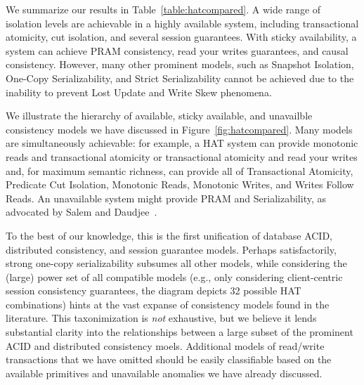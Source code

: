 We summarize our results in Table~\ref{table:hatcompared}. A wide
range of isolation levels are achievable in a highly available system,
including transactional atomicity, cut isolation, and several session
guarantees. With sticky availability, a system can achieve PRAM
consistency, read your writes guarantees, and causal
consistency. However, many other prominent models, such as Snapshot
Isolation, One-Copy Serializability, and Strict Serializability cannot
be achieved due to the inability to prevent Lost Update and Write Skew phenomena.

We illustrate the hierarchy of available, sticky available, and
unavailble consistency models we have discussed in
Figure~\ref{fig:hatcompared}. Many models are simultaneously
achievable: for example, a HAT system can provide monotonic reads and
transactional atomicity or transactional atomicity and read your
writes and, for maximum semantic richness, can provide all of
Transactional Atomicity, Predicate Cut Isolation, Monotonic Reads,
Monotonic Writes, and Writes Follow Reads. An unavailable system might
provide PRAM and Serializability, as advocated by Salem and
Daudjee~\cite{needed}.

To the best of our knowledge, this is the first unification of
database ACID, distributed consistency, and session guarantee
models. Perhaps satisfactorily, strong one-copy serializability
subsumes all other models, while considering the (large) power set of
all compatible models (e.g., only considering client-centric session
consistency guarantees, the diagram depicts 32 possible HAT
combinations) hints at the vast expanse of consistency models found in
the literature. This taxonimization is \textit{not} exhaustive, but we
believe it lends substantial clarity into the relationships between a
large subset of the prominent ACID and distributed consistency
moels. Additional models of read/write transactions that we have
omitted should be easily classifiable based on the available
primitives and unavailable anomalies we have already discussed.

 \newcommand{\lostupdate}{$^\dagger$}
 \newcommand{\rwskew}{$^\ddagger$}
 \newcommand{\linearizable}{$^\oplus$}

